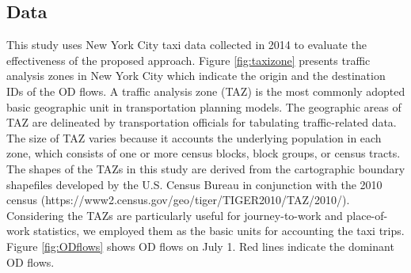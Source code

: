 \documentclass[a4paper,UKenglish]{lipics-v2018}
\begin{document}
\subsection{Data}
This study uses New York City taxi data collected in 2014 to evaluate the effectiveness of the proposed approach.
Figure \ref{fig:taxizone} presents traffic analysis zones in New York City which indicate the origin and the destination IDs of the OD flows. A traffic analysis zone (TAZ) is the most commonly adopted basic geographic unit in transportation planning models. The geographic areas of TAZ are delineated by transportation officials for tabulating traffic-related data. The size of TAZ varies because it accounts the underlying population in each zone, which consists of one or more census blocks, block groups, or census tracts. The shapes of the TAZs in this study are derived from the cartographic boundary shapefiles developed by the U.S. Census Bureau in conjunction with the 2010 census (https://www2.census.gov/geo/tiger/TIGER2010/TAZ/2010/). Considering the TAZs are particularly useful for journey-to-work and place-of-work statistics, we employed them as the basic units for accounting the taxi trips. 
Figure \ref{fig:ODflows} shows OD flows on July 1. Red lines indicate the dominant OD flows.
\end{document}
